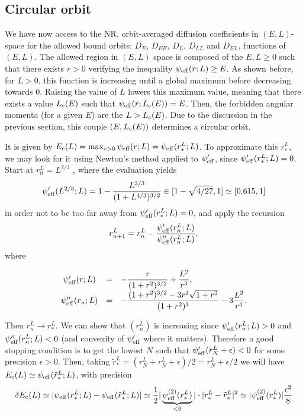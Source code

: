 \documentclass[11pt]{article}
\newcommand{\dE}{D_{E}}
\newcommand{\dL}{D_{L}}
\newcommand{\dEE}{D_{EE}}
\newcommand{\dLL}{D_{LL}}
\newcommand{\dEL}{D_{EL}}
\newcommand{\psieff}{\psi_{\rm{eff}}}
\newcommand{\Ec}{E_{{\rm{c}}}}
\newcommand{\Lc}{L_{{\rm{c}}}}
\begin{document}
\subsection{Circular orbit}
\label{subsec:Circular_Energy}

We have now access to the NR, orbit-averaged diffusion coefficients
in $(E,L)$-space for the allowed bound orbits: $\dE$, $\dEE$,
$\dL$, $\dLL$ and $\dEL$, functions of
$(E,L)$. The allowed region in $(E,L)$ space is composed of the
$E,L\geq0$ such that there exists $r>0$ verifying the inequality
$\psieff(r;L)\geq E$. As shown before, for $L>0$, this function  is increasing until a global
maximum before decreasing towards $0$. Raising the value of $L$
lowers this maximum value, meaning that there exists a value $\Lc(E)$
such that $\psieff(r;\Lc(E))=E$. Then, the forbidden angular
momenta (for a given $E$) are the $L>\Lc(E)$. Due to the
discussion in the previous section, this couple $(E,\Lc(E))$
determines a circular orbit.

It is given by $\Ec(L)=\max_{r>0}\psieff(r;L)=\psieff(r_{*}^{L};L)$.
To approximate this $r_{*}^{L}$, we may look for it using Newton's
method applied to $\psieff'$, since $\psieff'(r_{*}^{L};L)=0$.
Start at $r_{0}^{L}=L^{2/3}$ , where the evaluation yields
\begin{equation}
\psieff'(L^{2/3};L)=1-\frac{L^{2/3}}{(1+L^{4/3})^{3/2}}\in[1-\sqrt{4/27},1]\simeq[0.615,1]
\label{eq:start_recursion_Ec}
\end{equation}
in order not to be too far away from $\psieff'(r_{*}^{L};L)=0$,
and apply the recursion
\begin{equation}
r_{n+1}^{L}=r_{n}^{L}-\frac{\psi'_{{\rm eff}}(r_{n}^{L};L)}{\psi''_{{\rm eff}}(r_{n}^{L};L)},
\label{eq:recursion_Ec}
\end{equation}
where

\begin{equation}
\begin{array}{ccl}
 \psieff'(r;L) & =& \displaystyle{-\frac{r}{(1+r^{2})^{3/2}}+\frac{L^{2}}{r^{3}}} ,\\
  
  \psieff''(r_{n};L) & =&\displaystyle{-\frac{(1+r^{2})^{3/2}-3r^{2}\sqrt{1+r^{2}}}{(1+r^{2})^{3}}-3\frac{L^{2}}{r^{4}}} .
\end{array}
\label{eq:psieff_derivatives}
\end{equation}

Then $r_{n}^{L}\rightarrow r_{*}^{L}$. We can show that $(r_{n}^{L})$
is increasing since $\psieff'(r_{n}^{L};L)>0$ and $\psieff''(r_{n}^{L};L)<0$
(and convexity of $\psieff'$ where it matters). Therefore
a good stopping condition is to get the lowest $N$ such that $\psieff'(r_{N}^{L}+\epsilon)<0$
for some precision $\epsilon>0$. Then, taking $\tilde{r}_{*}^{L}=(r_{N}^{L}+r_{N}^{L}+\epsilon)/2=r_{N}^{L}+\epsilon/2$
we will have $\Ec(L)\simeq\psieff(\tilde{r}_{*}^{L};L)$,
with precision 
\begin{equation}
\delta \Ec(L)\simeq|\psieff(r_{*}^{L};L)-\psieff(\tilde{r}_{*}^{L};L)|\simeq\frac{1}{2}|\underbrace{\psieff^{(2)}(r_{*}^{L})}_{<0}|\cdot|r_{*}^{L}-\tilde{r}_{*}^{L}|^{2}\simeq|\psieff^{(2)}(r_{*}^{L})|\frac{\epsilon^{2}}{8}
\label{eq:precision_Ec}
\end{equation}
\end{document}
